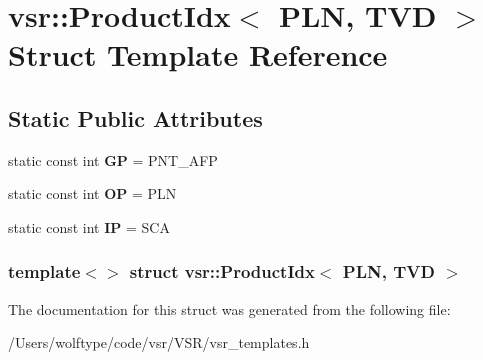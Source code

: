 \hypertarget{structvsr_1_1_product_idx_3_01_p_l_n_00_01_t_v_d_01_4}{\section{vsr\-:\-:Product\-Idx$<$ P\-L\-N, T\-V\-D $>$ Struct Template Reference}
\label{structvsr_1_1_product_idx_3_01_p_l_n_00_01_t_v_d_01_4}
}
\subsection*{Static Public Attributes}
\begin{DoxyCompactItemize}
\item 
\hypertarget{structvsr_1_1_product_idx_3_01_p_l_n_00_01_t_v_d_01_4_a667f7f82534c7b776257bdbf3aada272}{static const int {\bfseries G\-P} = P\-N\-T\-\_\-\-A\-F\-P}\label{structvsr_1_1_product_idx_3_01_p_l_n_00_01_t_v_d_01_4_a667f7f82534c7b776257bdbf3aada272}

\item 
\hypertarget{structvsr_1_1_product_idx_3_01_p_l_n_00_01_t_v_d_01_4_a63d6f1ff4e0b7d9db28dbecb0cadaacd}{static const int {\bfseries O\-P} = P\-L\-N}\label{structvsr_1_1_product_idx_3_01_p_l_n_00_01_t_v_d_01_4_a63d6f1ff4e0b7d9db28dbecb0cadaacd}

\item 
\hypertarget{structvsr_1_1_product_idx_3_01_p_l_n_00_01_t_v_d_01_4_ad9e2b79994492d25c8b8ca8eb0b479e5}{static const int {\bfseries I\-P} = S\-C\-A}\label{structvsr_1_1_product_idx_3_01_p_l_n_00_01_t_v_d_01_4_ad9e2b79994492d25c8b8ca8eb0b479e5}

\end{DoxyCompactItemize}
\subsubsection*{template$<$$>$ struct vsr\-::\-Product\-Idx$<$ P\-L\-N, T\-V\-D $>$}



The documentation for this struct was generated from the following file\-:\begin{DoxyCompactItemize}
\item 
/\-Users/wolftype/code/vsr/\-V\-S\-R/vsr\-\_\-templates.\-h\end{DoxyCompactItemize}
